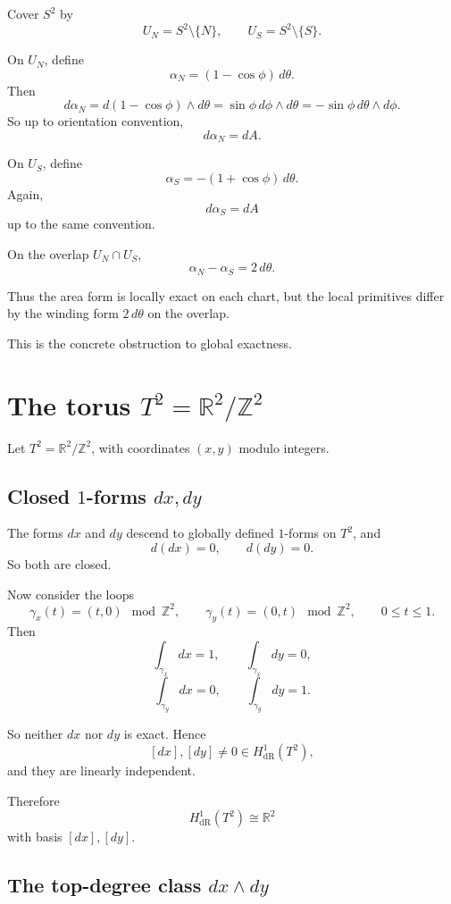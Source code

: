 \documentclass[11pt]{article}
\begin{document}
	Cover \(S^2\) by
	\[
	U_N=S^2\setminus\{N\},\qquad U_S=S^2\setminus\{S\}.
	\]
	
	On \(U_N\), define
	\[
	\alpha_N=(1-\cos\phi)\,d\theta.
	\]
	Then
	\[
	d\alpha_N=d(1-\cos\phi)\wedge d\theta
	=\sin\phi\,d\phi\wedge d\theta
	=-\sin\phi\,d\theta\wedge d\phi.
	\]
	So up to orientation convention,
	\[
	d\alpha_N=dA.
	\]
	
	On \(U_S\), define
	\[
	\alpha_S=-(1+\cos\phi)\,d\theta.
	\]
	Again,
	\[
	d\alpha_S=dA
	\]
	up to the same convention.
	
	On the overlap \(U_N\cap U_S\),
	\[
	\alpha_N-\alpha_S=2\,d\theta.
	\]
	
	Thus the area form is locally exact on each chart, but the local primitives differ by the winding form \(2\,d\theta\) on the overlap.
	
	This is the concrete obstruction to global exactness.
	
	\section{The torus \(T^2=\mathbb{R}^2/\mathbb{Z}^2\)}
	
	Let \(T^2=\mathbb{R}^2/\mathbb{Z}^2\), with coordinates \((x,y)\) modulo integers.
	
	\subsection{Closed \(1\)-forms \(dx,dy\)}
	
	The forms \(dx\) and \(dy\) descend to globally defined \(1\)-forms on \(T^2\), and
	\[
	d(dx)=0,\qquad d(dy)=0.
	\]
	So both are closed.
	
	Now consider the loops
	\[
	\gamma_x(t)=(t,0)\!\!\mod \mathbb{Z}^2,\qquad
	\gamma_y(t)=(0,t)\!\!\mod \mathbb{Z}^2,
	\qquad 0\le t\le 1.
	\]
	Then
	\[
	\int_{\gamma_x}dx=1,\qquad \int_{\gamma_x}dy=0,
	\]
	\[
	\int_{\gamma_y}dx=0,\qquad \int_{\gamma_y}dy=1.
	\]
	
	So neither \(dx\) nor \(dy\) is exact. Hence
	\[
	[dx],[dy]\neq 0 \in H^1_{\mathrm{dR}}(T^2),
	\]
	and they are linearly independent.
	
	Therefore
	\[
	H^1_{\mathrm{dR}}(T^2)\cong \mathbb{R}^2
	\]
	with basis \([dx],[dy]\).
	
	\subsection{The top-degree class \(dx\wedge dy\)}
	
\end{document}
